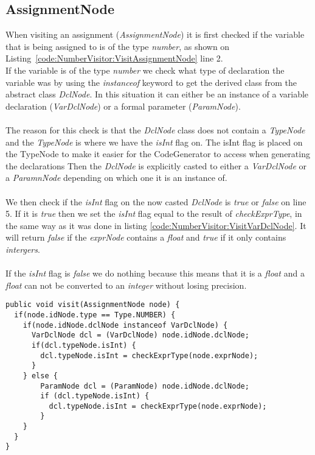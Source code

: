 \subsection{AssignmentNode}
When visiting an assignment (\textit{AssignmentNode}) it is first checked if the variable that is being assigned to is of the type \textit{number}, as shown on Listing~\ref{code:NumberVisitor:VisitAssignmentNode} line 2. 
\\
If the variable is of the type \textit{number} we check what type of declaration the variable was by using the \textit{instanceof} keyword to get the derived class from the abstract class \textit{DclNode}.
In this situation it can either be an instance of a variable declaration (\textit{VarDclNode}) or a formal parameter (\textit{ParamNode}).
\\\\
The reason for this check is that the \textit{DclNode} class does not contain a \textit{TypeNode} and the \textit{TypeNode} is where we have the \textit{isInt} flag on. The isInt flag is placed on the TypeNode to make it easier for the CodeGenerator to access when generating the declarations
Then the \textit{DclNode} is explicitly casted to either a \textit{VarDclNode} or a \textit{ParamnNode} depending on which one it is an instance of. 
\\\\
We then check if the \textit{isInt} flag on the now casted \textit{DclNode} is \textit{true} or \textit{false} on line 5. 
If it is \textit{true} then we set the \textit{isInt} flag equal to the result of \textit{checkExprType}, in the same way as it was done in listing \ref{code:NumberVisitor:VisitVarDclNode}. 
It will return \textit{false} if the \textit{exprNode} contains a \textit{float} and \textit{true} if it only contains \textit{intergers}.
\\\\
If the \textit{isInt} flag is \textit{false} we do nothing because this means that it is a \textit{float} and a \textit{float} can not be converted to an \textit{integer} without losing precision.

\begin{lstlisting}[caption={code to implement the AssignmentNode visitor}, label={code:NumberVisitor:VisitAssignmentNode}]
public void visit(AssignmentNode node) {
  if(node.idNode.type == Type.NUMBER) {
    if(node.idNode.dclNode instanceof VarDclNode) {
      VarDclNode dcl = (VarDclNode) node.idNode.dclNode;
      if(dcl.typeNode.isInt) {
        dcl.typeNode.isInt = checkExprType(node.exprNode);
      }
    } else {
        ParamNode dcl = (ParamNode) node.idNode.dclNode;
        if (dcl.typeNode.isInt) {
          dcl.typeNode.isInt = checkExprType(node.exprNode);
        }
    }
  }
}
\end{lstlisting}


